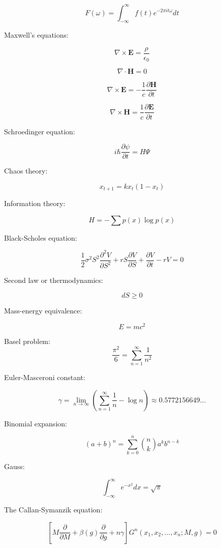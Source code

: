 \documentclass{article}
\begin{document}
\[
  F(\omega) = \int_{-\infty}^\infty f(t) e^{-2\pi i t \omega} dt
\]

Maxwell's equations: 

\begin{equation}
\nabla \times \textbf{E}=\frac{\rho}{\epsilon_0}
\end{equation}

\begin{equation}
\nabla \cdot \textbf{H}=0
\end{equation}

\begin{equation}
\nabla \times \textbf{E}=-\frac 1c\frac{\partial \textbf{H}}{\partial t}
\end{equation}

\begin{equation}
\nabla \times \textbf{H}=\frac 1c\frac{\partial \textbf{E}}{\partial t}
\end{equation}

Schroedinger equation:

\[
i \hbar \frac{\partial \psi}{\partial t} = H\Psi
\]

Chaos theory:

$$x_{t+1}=kx_t(1-x_t)$$

Information theory:

\[
  H=-\sum p(x)\log p(x)
\]

Black-Scholes equation:

$$\frac12\sigma^2S^2\frac{\partial^2V}{\partial S^2}+rS\frac{\partial V}{\partial S}+\frac{\partial V}{\partial t}-rV=0$$

Second law or thermodynamics:

$$dS\ge 0$$

Mass-energy equivalence:

$$E=mc^2$$

Basel problem:
\[
  \frac{\pi^2}{6}=\sum_{n=1}^\infty \frac{1}{n^2}
\]

Euler-Masceroni constant:

\[
\gamma = \lim_{n\to\infty}(\sum_{n=1}^\infty \frac{1}{n}-\log n)\approx 0.5772156649\ldots
\]

Binomial expansion:

\[
(a+b)^n = \sum_{k=0}^n \binom{n}{k} a^k b^{n-k}  
\]

Gauss:

$$\int_{-\infty}^\infty e^{-x^2} dx = \sqrt{\pi}$$

The Callan-Symanzik equation:

\[
\left[M\frac{\partial}{\partial M}+\beta(g)\frac{\partial}{\partial g}+n\gamma\right]G^n(x_1,x_2,...,x_n;M,g)=0
\]
\end{document}
